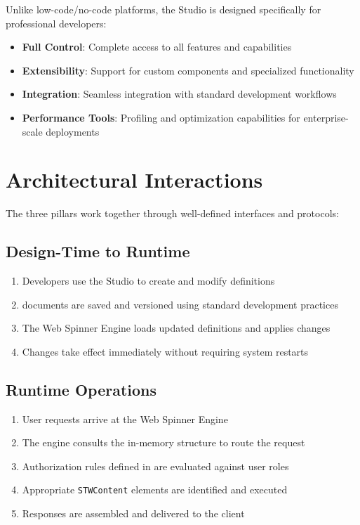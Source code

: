 Unlike low-code/no-code platforms, the Studio is designed specifically for professional developers:

\begin{itemize}
    \item \textbf{Full Control}: Complete access to all \wbdl{} features and capabilities
    \item \textbf{Extensibility}: Support for custom components and specialized functionality
    \item \textbf{Integration}: Seamless integration with standard development workflows
    \item \textbf{Performance Tools}: Profiling and optimization capabilities for enterprise-scale deployments
\end{itemize}

\section{Architectural Interactions}
\label{sec:architectural-interactions}

The three pillars work together through well-defined interfaces and protocols:

\subsection{Design-Time to Runtime}

\begin{enumerate}
    \item Developers use the Studio to create and modify \webbase{} definitions
    \item \wbdl{} documents are saved and versioned using standard development practices
    \item The Web Spinner Engine loads updated \webbase{} definitions and applies changes
    \item Changes take effect immediately without requiring system restarts
\end{enumerate}

\subsection{Runtime Operations}

\begin{enumerate}
    \item User requests arrive at the Web Spinner Engine
    \item The engine consults the in-memory \webbase{} structure to route the request
    \item Authorization rules defined in \wbdl{} are evaluated against user roles
    \item Appropriate \texttt{STWContent} elements are identified and executed
    \item Responses are assembled and delivered to the client
\end{enumerate}

